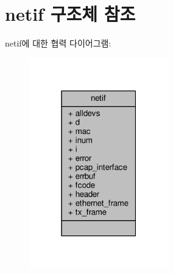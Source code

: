\hypertarget{structnetif}{}\section{netif 구조체 참조}
\label{structnetif}


netif에 대한 협력 다이어그램\+:
\nopagebreak
\begin{figure}[H]
\begin{center}
\leavevmode
\includegraphics[width=171pt]{structnetif__coll__graph}
\end{center}
\end{figure}
